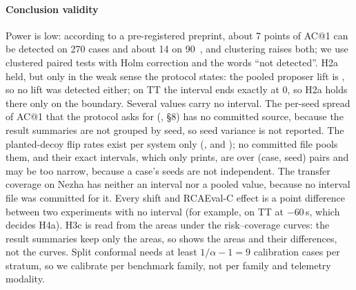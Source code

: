 \paragraph{Conclusion validity}
Power is low: according to a pre-registered preprint, about 7 points of AC@1 can be detected on 270 cases and about 14 on 90~\cite{hussain2026prereg}, and clustering raises both; we use clustered paired tests with Holm correction and the words ``not detected''.
H2a held, but only in the weak sense the protocol states: the pooled proposer lift is  , so no lift was detected either; on TT the interval  ends exactly at 0, so H2a holds there only on the boundary.
Several values carry no interval.
The per-seed spread of AC@1 that the protocol asks for (\allowbreak{}, \S8) has no committed source, because the result summaries are not grouped by seed, so seed variance is not reported.
The planted-decoy flip rates exist per system only (,  and ); no committed file pools them, and their exact intervals, which only  prints, are over (case, seed) pairs and may be too narrow, because a case's seeds are not independent.
The transfer coverage on Nezha has neither an interval nor a pooled value, because no interval file was committed for it.
Every shift and RCAEval-C effect is a point difference between two experiments with no interval (for example,  on TT at $-60$\,s, which decides H4a).
H3c is read from the areas under the risk--coverage curves: the result summaries keep only the areas, so  shows the areas and their differences, not the curves.
Split conformal needs at least $1/\alpha - 1 = 9$ calibration cases per stratum, so we calibrate per benchmark family, not per family and telemetry modality.

